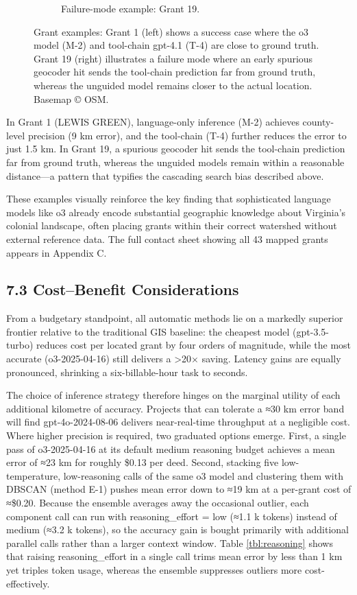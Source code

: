 \documentclass[
  10pt]{article}
\begin{document}
\begin{figure}[H]
\begin{subfigure}{0.48\textwidth}
  \caption{Failure-mode example: Grant 19.}
  \label{fig:grant19}
\end{subfigure}
\caption{Grant examples: Grant 1 (left) shows a success case where the o3 model (M-2) and tool-chain gpt-4.1 (T-4) are close to ground truth. Grant 19 (right) illustrates a failure mode where an early spurious geocoder hit sends the tool-chain prediction far from ground truth, whereas the unguided model remains closer to the actual location. Basemap © OSM.}
\label{fig:grant_maps}
\end{figure}

In Grant 1 (LEWIS GREEN), language-only inference (M-2) achieves
county-level precision (9 km error), and the tool-chain (T-4) further
reduces the error to just 1.5 km. In Grant 19, a spurious geocoder hit
sends the tool-chain prediction far from ground truth, whereas the
unguided models remain within a reasonable distance---a pattern that
typifies the cascading search bias described above.

These examples visually reinforce the key finding that sophisticated
language models like o3 already encode substantial geographic knowledge
about Virginia's colonial landscape, often placing grants within their
correct watershed without external reference data. The full contact
sheet showing all 43 mapped grants appears in Appendix C.

\subsection{7.3 Cost--Benefit
Considerations}\label{costbenefit-considerations}

From a budgetary standpoint, all automatic methods lie on a markedly
superior frontier relative to the traditional GIS baseline: the cheapest
model (gpt-3.5-turbo) reduces cost per located grant by four orders of
magnitude, while the most accurate (o3-2025-04-16) still delivers a
\textgreater20× saving. Latency gains are equally pronounced, shrinking
a six-billable-hour task to seconds.

The choice of inference strategy therefore hinges on the marginal
utility of each additional kilometre of accuracy. Projects that can
tolerate a ≈30 km error band will find gpt-4o-2024-08-06 delivers
near-real-time throughput at a negligible cost. Where higher precision
is required, two graduated options emerge. First, a single pass of
o3-2025-04-16 at its default medium reasoning budget achieves a mean
error of ≈23 km for roughly \$0.13 per deed. Second, stacking five
low-temperature, low-reasoning calls of the same o3 model and clustering
them with DBSCAN (method E-1) pushes mean error down to ≈19 km at a
per-grant cost of ≈\$0.20. Because the ensemble averages away the
occasional outlier, each component call can run with reasoning\_effort =
low (≈1.1 k tokens) instead of medium (≈3.2 k tokens), so the accuracy
gain is bought primarily with additional parallel calls rather than a
larger context window. Table \ref{tbl:reasoning} shows that raising
reasoning\_effort in a single call trims mean error by less than 1 km
yet triples token usage, whereas the ensemble suppresses outliers more
cost-effectively.
\end{document}
